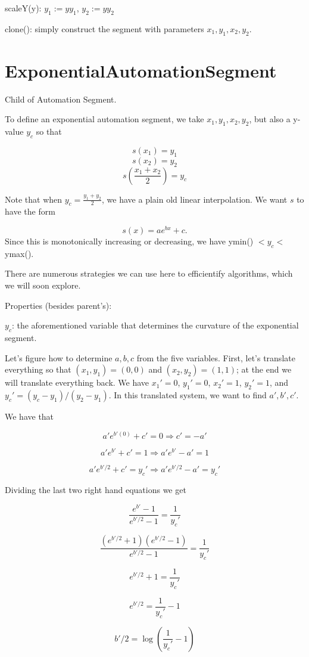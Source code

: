 \documentclass{article}
\begin{document}
scaleY(y): $y_1:=yy_1$, $y_2:=yy_2$

clone(): simply construct the segment with parameters $x_1, y_1, x_2, y_2$.

\section{ExponentialAutomationSegment}

Child of Automation Segment.

To define an exponential automation segment, we take $x_1, y_1, x_2, y_2$, but also a y-value $y_c$ so that

$$s(x_1)=y_1$$
$$s(x_2)=y_2$$
$$s\left(\frac{x_1+x_2}{2}\right) = y_c$$

Note that when $y_c = \frac{y_1+y_2}{2}$, we have a plain old linear interpolation. We want $s$ to have the form

$$s(x) = ae^{bx}+c.$$ Since this is monotonically increasing or decreasing, we have ymin() $< y_c <$ ymax().

There are numerous strategies we can use here to efficientify algorithms, which we will soon explore.

Properties (besides parent's):

$y_c$: the aforementioned variable that determines the curvature of the exponential segment.

Let's figure how to determine $a,b,c$ from the five variables. First, let's translate everything so that $(x_1,y_1)=(0,0)$ and $(x_2, y_2)=(1,1)$; at the end we will translate everything back. We have $x_1'=0$, $y_1'=0$, $x_2'=1$, $y_2'=1$, and $y_c'=(y_c-y_1)/(y_2-y_1)$. In this translated system, we want to find $a',b',c'$.

We have that

$$a'e^{b'(0)}+c'=0\Longrightarrow c'=-a'$$

$$a'e^{b'}+c'=1\Longrightarrow a'e^{b'}-a'=1$$

$$a'e^{b'/2}+c'=y_c'\Longrightarrow a'e^{b'/2}-a'=y_c'$$

Dividing the last two right hand equations we get

$$\frac{e^{b'}-1}{e^{b'/2}-1}=\frac{1}{y_c'}$$

$$\frac{(e^{b'/2}+1)(e^{b'/2}-1)}{e^{b'/2}-1}=\frac{1}{y_c'}$$

$$e^{b'/2}+1=\frac{1}{y_c'}$$

$$e^{b'/2}=\frac{1}{y_c'}-1$$

$$b'/2 = \log\left(\frac{1}{y_c'}-1\right)$$
\end{document}
